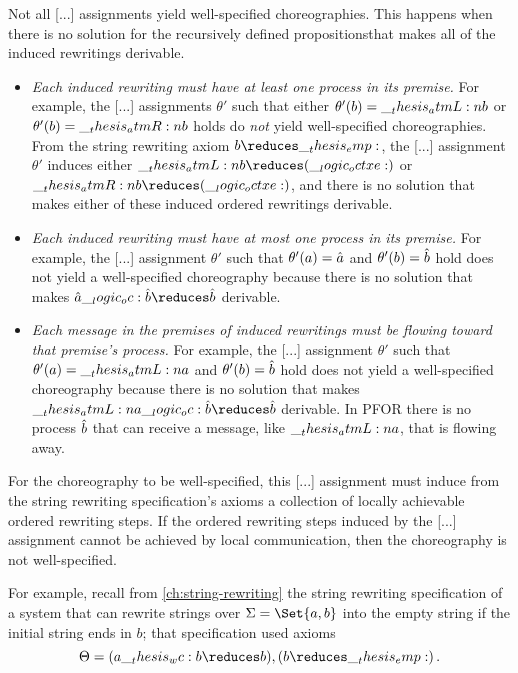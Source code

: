 Not all [...] assignments yield well-specified choreographies.
This happens when there is no solution for the recursively defined propositionsthat makes all of the induced rewritings derivable.
\begin{itemize}
\item
  \emph{Each induced rewriting must have at least one process in its premise.}
  For example, the [...] assignments $\theta'$ such that either $\theta'(b) = \__thesis_atmL:n {b}$ or $\theta'(b) = \__thesis_atmR:n {b}$ holds do \emph{not} yield well-specified choreographies.
  From the string rewriting axiom $b \reduces \emp$, the [...] assignment $\theta'$ induces either $\atmL{b} \reduces (\octxe)$ or $\atmR{b} \reduces (\octxe)$, and there is no solution that makes either of these induced ordered rewritings derivable.

\item
  \emph{Each induced rewriting must have at most one process in its premise.}
  For example, the [...] assignment $\theta'$ such that $\theta'(a) = \hat{a}$ and $\theta'(b) = \hat{b}$ hold does not yield a well-specified choreography because there is no solution that makes $\defp{a} \oc \defp{b} \reduces \defp{b}$ derivable.

\item
  \emph{Each message in the premises of induced rewritings must be flowing toward that premise's process.}
  For example, the [...] assignment $\theta'$ such that $\theta'(a) = \__thesis_atmL:n {a}$ and $\theta'(b) = \hat{b}$ hold does not yield a well-specified choreography because there is no solution that makes $\atmL{a} \oc \defp{b} \reduces \defp{b}$ derivable.
  In \ac{PFOR} there is no process $\hat{b}$ that can receive a message, like $\__thesis_atmL:n {a}$, that is flowing away.
\end{itemize}


For the choreography to be well-specified, this [...] assignment must induce from the string rewriting specification's axioms a collection of locally achievable  ordered rewriting steps.
If the ordered rewriting steps induced by the [...] assignment cannot be achieved by local communication, then the choreography is not well-specified.

For example, recall from \cref{ch:string-rewriting} the string rewriting specification of a system that can rewrite strings over $\sralph = \Set{a,b}$ into the empty string if the initial string ends in $b$;
that specification used axioms
\begin{equation*}
  \srsig = (a \wc b \reduces b) , (b \reduces \emp)
  \,.
\end{equation*}

